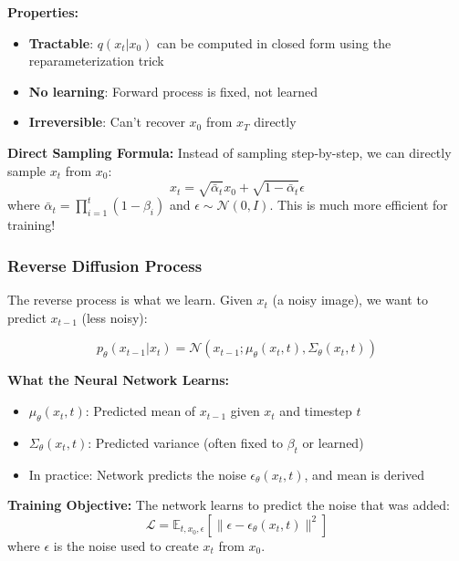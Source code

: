 \documentclass[journal]{IEEEtran}
\begin{document}
\textbf{Properties:}
\begin{itemize}
    \item \textbf{Tractable}: $q(x_t | x_0)$ can be computed in closed form using the reparameterization trick
    \item \textbf{No learning}: Forward process is fixed, not learned
    \item \textbf{Irreversible}: Can't recover $x_0$ from $x_T$ directly
\end{itemize}

\textbf{Direct Sampling Formula:} Instead of sampling step-by-step, we can directly sample $x_t$ from $x_0$:
\begin{equation}
x_t = \sqrt{\bar{\alpha}_t} x_0 + \sqrt{1-\bar{\alpha}_t} \epsilon
\end{equation}
where $\bar{\alpha}_t = \prod_{i=1}^t (1-\beta_i)$ and $\epsilon \sim \mathcal{N}(0, I)$. This is much more efficient for training!

\subsubsection{Reverse Diffusion Process}

The reverse process is what we learn. Given $x_t$ (a noisy image), we want to predict $x_{t-1}$ (less noisy):

\begin{equation}
p_\theta(x_{t-1} | x_t) = \mathcal{N}(x_{t-1}; \mu_\theta(x_t, t), \Sigma_\theta(x_t, t))
\end{equation}

\textbf{What the Neural Network Learns:}
\begin{itemize}
    \item $\mu_\theta(x_t, t)$: Predicted mean of $x_{t-1}$ given $x_t$ and timestep $t$
    \item $\Sigma_\theta(x_t, t)$: Predicted variance (often fixed to $\beta_t$ or learned)
    \item In practice: Network predicts the noise $\epsilon_\theta(x_t, t)$, and mean is derived
\end{itemize}

\textbf{Training Objective:} The network learns to predict the noise that was added:
\begin{equation}
\mathcal{L} = \mathbb{E}_{t, x_0, \epsilon} \left[ \|\epsilon - \epsilon_\theta(x_t, t)\|^2 \right]
\end{equation}
where $\epsilon$ is the noise used to create $x_t$ from $x_0$.
\end{document}
